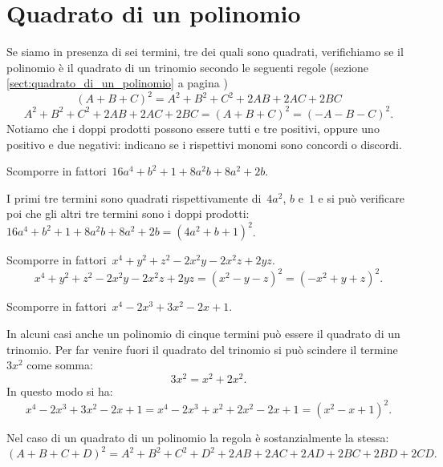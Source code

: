 \section{Quadrato di un polinomio}

Se siamo in presenza di sei termini, tre dei quali sono quadrati, verifichiamo se il polinomio è il quadrato di un
trinomio secondo le seguenti regole (sezione \ref{sect:quadrato_di_un_polinomio} a pagina \pageref{sect:quadrato_di_un_polinomio})
\begin{equation*}
(A+B+C)^{2}=A^{2}+B^{2}+C^{2}+2AB+2AC+2BC
\end{equation*}
\begin{equation*}
A^{2}+B^{2}+C^{2}+2AB+2AC+2BC=(A+B+C)^{2}=(-A-B-C)^{2}.
\end{equation*}
Notiamo che i doppi prodotti possono essere tutti e tre positivi, oppure uno positivo e due negativi:
indicano se i rispettivi monomi sono concordi o discordi.
\begin{exrig}
 \begin{esempio}
Scomporre in fattori~$16a^{4}+b^{2}+1+8a^{2}b+8a^{2}+2b$.

I primi tre termini sono quadrati rispettivamente di~$4a^{2}$, $b$ e~$1$ e si può verificare poi che gli altri tre termini sono
i doppi prodotti:~$16a^{4}+b^{2}+1+8a^{2}b+8a^{2}+2b=\left(4a^{2}+b+1\right)^{2}$.
 \end{esempio}

 \begin{esempio}
Scomporre in fattori~$x^{4}+y^{2}+z^{2}-2x^{2}y-2x^{2}z+2yz$.
\[x^{4}+y^{2}+z^{2}-2x^{2}y-2x^{2}z+2yz=\left(x^{2}-y-z\right)^{2}=\left(-x^{2}+y+z\right)^{2}.\]
 \end{esempio}

 \begin{esempio}
Scomporre in fattori~$x^{4}-2x^{3}+3x^{2}-2x+1$.

In alcuni casi anche un polinomio di cinque termini può essere il quadrato di un trinomio.
Per far venire fuori il quadrato del trinomio si può scindere il termine~$3x^{2}$ come somma:
\[3x^{2}=x^{2}+2x^{2}.\]
In questo modo si ha:
\[x^{4}-2x^{3}+3x^{2}-2x+1=x^{4}-2x^{3}+x^{2}+2x^{2}-2x+1=(x^{2}-x+1)^{2}.\]
 \end{esempio}
\end{exrig}

Nel caso di un quadrato di un polinomio la regola è sostanzialmente la stessa:
\begin{equation*}
(A+B+C+D)^{2}=A^{2}+B^{2}+C^{2}+D^{2}+2AB+2AC+2AD+2BC+2BD+2CD.
\end{equation*}
\ovalbox{\risolvii \ref{ese:16.13}, \ref{ese:16.14}, \ref{ese:16.15}, \ref{ese:16.16}, \ref{ese:16.17}, \ref{ese:16.18}, \ref{ese:16.19}}

